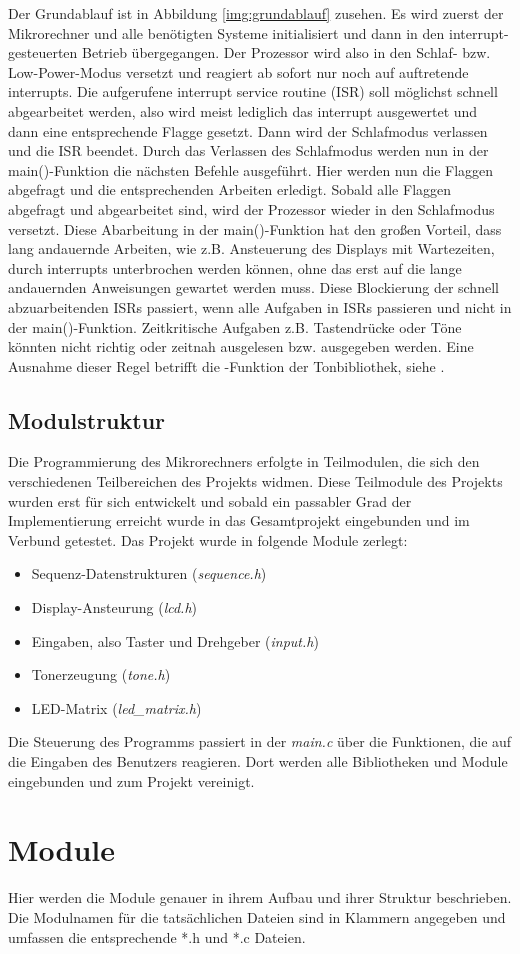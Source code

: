 \newline
Der Grundablauf ist in Abbildung \ref{img:grundablauf} zusehen. Es wird zuerst der Mikrorechner und alle benötigten Systeme initialisiert und dann in den interrupt-gesteuerten Betrieb übergegangen. Der Prozessor wird also in den Schlaf- bzw. Low-Power-Modus versetzt und reagiert ab sofort nur noch auf auftretende interrupts. Die aufgerufene interrupt service routine (ISR) soll möglichst schnell abgearbeitet werden, also wird meist lediglich das interrupt ausgewertet und dann eine entsprechende Flagge gesetzt. Dann wird der Schlafmodus verlassen und die ISR beendet. Durch das Verlassen des Schlafmodus werden nun in der main()-Funktion die nächsten Befehle ausgeführt. Hier werden nun die Flaggen abgefragt und die entsprechenden Arbeiten erledigt. Sobald alle Flaggen abgefragt und abgearbeitet sind, wird der Prozessor wieder in den Schlafmodus versetzt. Diese Abarbeitung in der main()-Funktion hat den großen Vorteil, dass lang andauernde Arbeiten, wie z.B. Ansteuerung des Displays mit Wartezeiten, durch interrupts unterbrochen werden können, ohne das erst auf die lange andauernden Anweisungen gewartet werden muss. Diese Blockierung der schnell abzuarbeitenden ISRs passiert, wenn alle Aufgaben in ISRs passieren und nicht in der main()-Funktion. Zeitkritische Aufgaben z.B. Tastendrücke oder Töne könnten nicht richtig oder zeitnah ausgelesen bzw. ausgegeben werden. Eine Ausnahme dieser Regel betrifft die -Funktion der Tonbibliothek, siehe .%

\subsection{Modulstruktur}
Die Programmierung des Mikrorechners erfolgte in Teilmodulen, die sich den verschiedenen Teilbereichen des Projekts widmen. Diese Teilmodule des Projekts wurden erst für sich entwickelt und sobald ein passabler Grad der Implementierung erreicht wurde in das Gesamtprojekt eingebunden und im Verbund getestet. Das Projekt wurde in folgende Module zerlegt:
\begin{itemize}
    \item Sequenz-Datenstrukturen (\textsl{sequence.h})
	\item Display-Ansteurung (\textsl{lcd.h})
	\item Eingaben, also Taster und Drehgeber (\textsl{input.h})
	\item Tonerzeugung (\textsl{tone.h})
	\item LED-Matrix (\textsl{led\_matrix.h})
\end{itemize}
Die Steuerung des Programms passiert in der \textsl{main.c} über die Funktionen, die auf die Eingaben des Benutzers reagieren. Dort werden alle Bibliotheken und Module eingebunden und zum Projekt vereinigt.

\section{Module}
Hier werden die Module genauer in ihrem Aufbau und ihrer Struktur beschrieben. Die Modulnamen für die tatsächlichen Dateien sind in Klammern angegeben und umfassen die entsprechende *.h und *.c Dateien.
